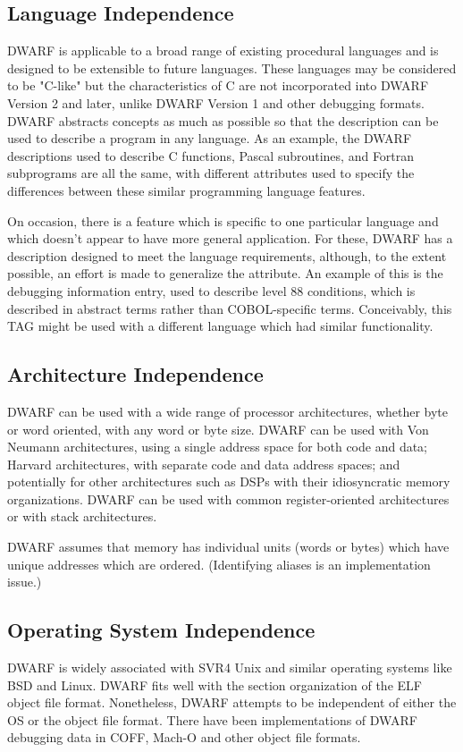 \subsection{Language Independence}
DWARF is applicable to a broad range of existing procedural
languages and is designed to be extensible to future languages.
These languages may be considered to be "C-like" but the
characteristics of C are not incorporated into DWARF Version 2
and later, unlike DWARF Version 1 and other debugging formats.
DWARF abstracts concepts as much as possible so that the
description can be used to describe a program in any language.
As an example, the DWARF descriptions used to describe C functions,
Pascal subroutines, and Fortran subprograms are all the same,
with different attributes used to specify the differences between
these similar programming language features.

On occasion, there is a feature which is specific to one
particular language and which doesn't appear to have more
general application.  For these, DWARF has a description
designed to meet the language requirements, although, to the
extent possible, an effort is made to generalize the attribute.
An example of this is the \DWTAGconditionNAME{}
debugging information entry,
used to describe  level 88 conditions, which
is described in abstract terms rather than COBOL-specific terms.
Conceivably, this TAG might be used with a different language
which had similar functionality.

\subsection{Architecture Independence}
DWARF can be used with a wide range of processor architectures,
whether byte or word oriented,
\db
with any word or byte size.
DWARF can be used with Von Neumann architectures,
using a single address space for both code and data; Harvard
architectures, with separate code and data address spaces; and
potentially for other architectures such as DSPs with their
idiosyncratic memory organizations.  DWARF can be used with
common register-oriented architectures or with stack architectures.

DWARF assumes that memory has individual units (words or bytes)
which have unique addresses which are ordered.
\db
(Identifying aliases is an implementation issue.)

\subsection{Operating System Independence}
DWARF is widely associated with SVR4 Unix and similar operating
systems like BSD and Linux.  DWARF fits well with the section
organization of the ELF object file format. Nonetheless, DWARF
attempts to be independent of either the OS or the object file
format.  There have been implementations of DWARF debugging
data in COFF, Mach-O and other object file formats.

